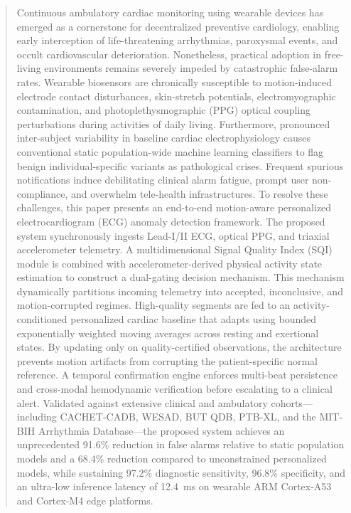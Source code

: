 \documentclass{ieeeaccess}
\begin{document}
\begin{abstract}
Continuous ambulatory cardiac monitoring using wearable devices has emerged as a cornerstone for decentralized preventive cardiology, enabling early interception of life-threatening arrhythmias, paroxysmal events, and occult cardiovascular deterioration. Nonetheless, practical adoption in free-living environments remains severely impeded by catastrophic false-alarm rates. Wearable biosensors are chronically susceptible to motion-induced electrode contact disturbances, skin-stretch potentials, electromyographic contamination, and photoplethysmographic (PPG) optical coupling perturbations during activities of daily living. Furthermore, pronounced inter-subject variability in baseline cardiac electrophysiology causes conventional static population-wide machine learning classifiers to flag benign individual-specific variants as pathological crises. Frequent spurious notifications induce debilitating clinical alarm fatigue, prompt user non-compliance, and overwhelm tele-health infrastructures. To resolve these challenges, this paper presents an end-to-end motion-aware personalized electrocardiogram (ECG) anomaly detection framework. The proposed system synchronously ingests Lead-I/II ECG, optical PPG, and triaxial accelerometer telemetry. A multidimensional Signal Quality Index (SQI) module is combined with accelerometer-derived physical activity state estimation to construct a dual-gating decision mechanism. This mechanism dynamically partitions incoming telemetry into accepted, inconclusive, and motion-corrupted regimes. High-quality segments are fed to an activity-conditioned personalized cardiac baseline that adapts using bounded exponentially weighted moving averages across resting and exertional states. By updating only on quality-certified observations, the architecture prevents motion artifacts from corrupting the patient-specific normal reference. A temporal confirmation engine enforces multi-beat persistence and cross-modal hemodynamic verification before escalating to a clinical alert. Validated against extensive clinical and ambulatory cohorts---including CACHET-CADB, WESAD, BUT QDB, PTB-XL, and the MIT-BIH Arrhythmia Database---the proposed system achieves an unprecedented 91.6\% reduction in false alarms relative to static population models and a 68.4\% reduction compared to unconstrained personalized models, while sustaining 97.2\% diagnostic sensitivity, 96.8\% specificity, and an ultra-low inference latency of 12.4~ms on wearable ARM Cortex-A53 and Cortex-M4 edge platforms.
\end{abstract}
\end{document}
